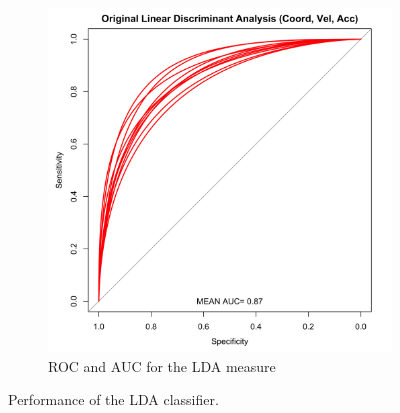 \documentclass{article}
\begin{document}
\begin{figure}
\begin{subfigure}[b]{0.35\textwidth}
\includegraphics[width=\textwidth]{ROC_LDA-FULL.png}
\caption{ROC and AUC for the LDA measure}\label{ROC:LDA}
\end{subfigure}
\caption{Performance of the LDA classifier.}
\end{figure}
\end{document}
